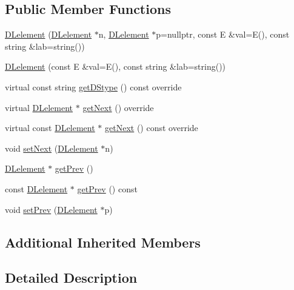 \subsection*{Public Member Functions}
\begin{DoxyCompactItemize}
\item 
\hyperlink{classbridges_1_1_d_lelement_a846424760c641ba5f496615361d8f79c}{D\+Lelement} (\hyperlink{classbridges_1_1_d_lelement}{D\+Lelement} $\ast$n, \hyperlink{classbridges_1_1_d_lelement}{D\+Lelement} $\ast$p=nullptr, const E \&val=E(), const string \&lab=string())
\item 
\hyperlink{classbridges_1_1_d_lelement_aab0e126bc0b34815f855899b5a8fa75a}{D\+Lelement} (const E \&val=E(), const string \&lab=string())
\item 
virtual const string \hyperlink{classbridges_1_1_d_lelement_a109be7aba8bd3d0450859938b5d3144c}{get\+D\+Stype} () const override
\item 
virtual \hyperlink{classbridges_1_1_d_lelement}{D\+Lelement} $\ast$ \hyperlink{classbridges_1_1_d_lelement_a0c713707d8c7d0a97fe4194ed6592ede}{get\+Next} () override
\item 
virtual const \hyperlink{classbridges_1_1_d_lelement}{D\+Lelement} $\ast$ \hyperlink{classbridges_1_1_d_lelement_a648012849263b4b1cd2d504d5e5fd880}{get\+Next} () const override
\item 
void \hyperlink{classbridges_1_1_d_lelement_aba19c60b1d10c145b1b737f9134f4497}{set\+Next} (\hyperlink{classbridges_1_1_d_lelement}{D\+Lelement} $\ast$n)
\item 
\hyperlink{classbridges_1_1_d_lelement}{D\+Lelement} $\ast$ \hyperlink{classbridges_1_1_d_lelement_a5b0316fb255d022b0dc3065d681fc2a7}{get\+Prev} ()
\item 
const \hyperlink{classbridges_1_1_d_lelement}{D\+Lelement} $\ast$ \hyperlink{classbridges_1_1_d_lelement_a6b46ea401b8192e9043f0493adcec63e}{get\+Prev} () const
\item 
void \hyperlink{classbridges_1_1_d_lelement_af146e0e10faba6395272d5fc1560f266}{set\+Prev} (\hyperlink{classbridges_1_1_d_lelement}{D\+Lelement} $\ast$p)
\end{DoxyCompactItemize}
\subsection*{Additional Inherited Members}


\subsection{Detailed Description}
